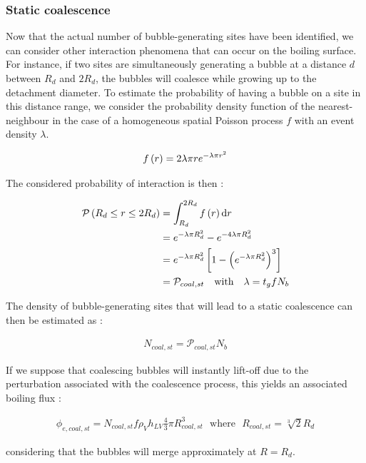 \subsubsection{Static coalescence}

Now that the actual number of bubble-generating sites have been identified, we can consider other interaction phenomena that can occur on the boiling surface. For instance, if two sites are simultaneously generating a bubble at a distance $d$ between $R_{d}$ and $2R_{d}$, the bubbles will coalesce while growing up to the detachment diameter. To estimate the probability of having a bubble on a site in this distance range, we consider the probability density function of the nearest-neighbour in the case of a homogeneous spatial Poisson process $f$ with an event density $\lambda$. 

\begin{align}
f\left( r \right)=2\lambda \pi r e^{-\lambda \pi r^{2}}
\end{align} 

The considered probability of interaction is then :

\begin{align}
\mathcal{P}\parth{R_{d}\leq r \leq 2R_{d}} &=\int_{R_{d}}^{2R_{d}}f\parth{r} \mathrm{d}r \\
%
&= e^{-\lambda \pi R_{d}^{2}} - e^{-4\lambda \pi R_{d}^{2}}\\
%
&= e^{-\lambda \pi R_{d}^{2}}\crocht{1-\parth{e^{-\lambda \pi R_{d}^{2}}}^{3}} \\
&= \mathcal{P}_{coal,st} \ \ \ \text{with}\ \ \ \lambda=t_{g} f N_{b}
\end{align}

The density of bubble-generating sites that will lead to a static coalescence can then be estimated as :

\begin{align}
N_{coal,st}=\mathcal{P}_{coal,st}N_{b}
\end{align}

If we suppose that coalescing bubbles will instantly lift-off due to the perturbation associated with the coalescence process, this yields an associated boiling flux :

\begin{align}
\phi_{e,coal,st}=N_{coal,st} f \rho_{V}h_{LV} \frac{4}{3}\pi R_{coal,st}^{3} \ \ \ \text{where}\ \ \ R_{coal,st}=\sqrt[3]{2}R_{d} 
\end{align}

considering that the bubbles will merge approximately at $R=R_{d}$.

